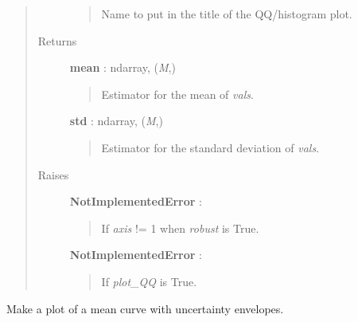 \documentclass[letterpaper,10pt,english]{sphinxmanual}
\begin{document}
\begin{fulllineitems}
\begin{quote}
\begin{description}
\begin{quote}
Name to put in the title of the QQ/histogram plot.
\end{quote}

\item[{Returns}] \leavevmode
\textbf{mean} : ndarray, (\emph{M},)
\begin{quote}

Estimator for the mean of \emph{vals}.
\end{quote}

\textbf{std} : ndarray, (\emph{M},)
\begin{quote}

Estimator for the standard deviation of \emph{vals}.
\end{quote}

\item[{Raises}] \leavevmode
\textbf{NotImplementedError} :
\begin{quote}

If \emph{axis} != 1 when \emph{robust} is True.
\end{quote}

\textbf{NotImplementedError} :
\begin{quote}

If \emph{plot\_QQ} is True.
\end{quote}

\end{description}\end{quote}

\end{fulllineitems}


\begin{fulllineitems}
\label{gptools:gptools.utils.univariate_envelope_plot}
Make a plot of a mean curve with uncertainty envelopes.

\end{fulllineitems}

\end{document}
